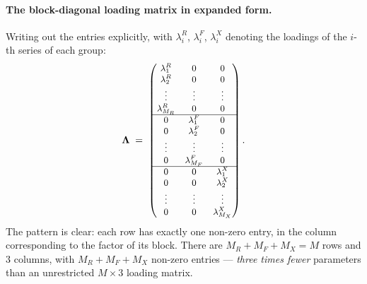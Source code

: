 \documentclass[11pt, a4paper, oneside]{article}
\newcommand{\mL}{\boldsymbol{\Lambda}}
\begin{document}
\paragraph{The block-diagonal loading matrix in expanded form.}
Writing out the entries explicitly, with $\lambda^R_i$, $\lambda^F_i$,
$\lambda^X_i$ denoting the loadings of the $i$-th series of each
group:
\[
\mL \;=\; {\small\begin{pmatrix}
\lambda^R_1 & 0 & 0 \\
\lambda^R_2 & 0 & 0 \\
\vdots & \vdots & \vdots \\
\lambda^R_{M_R} & 0 & 0 \\
\hline
0 & \lambda^F_1 & 0 \\
0 & \lambda^F_2 & 0 \\
\vdots & \vdots & \vdots \\
0 & \lambda^F_{M_F} & 0 \\
\hline
0 & 0 & \lambda^X_1 \\
0 & 0 & \lambda^X_2 \\
\vdots & \vdots & \vdots \\
0 & 0 & \lambda^X_{M_X}
\end{pmatrix}.}
\]
The pattern is clear: each row has exactly one non-zero entry, in
the column corresponding to the factor of its block. There are
$M_R + M_F + M_X = M$ rows and $3$ columns, with $M_R + M_F + M_X$
non-zero entries — \emph{three times fewer} parameters than an
unrestricted $M \times 3$ loading matrix.
\end{document}
